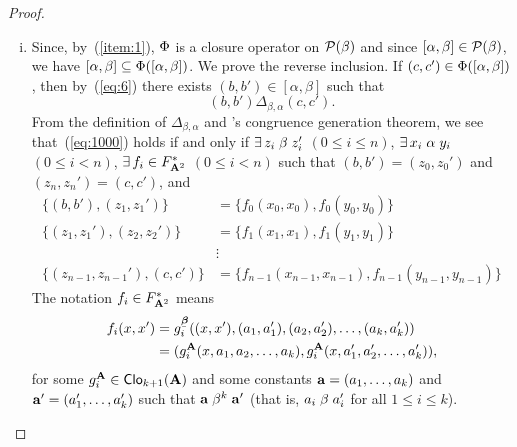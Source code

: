 \documentclass[11pt]{amsart}
\numberwithin{equation}{section}
\theoremstyle{plain}
\theoremstyle{definition}
\begin{document}
\begin{proof}
\begin{enumerate}[(i)]
  \item
    Since, by~(\ref{item:1}), $\Phi$ is a closure operator on $\mathcal{P}(\beta)$
    and since $[\alpha, \beta] \in \mathcal{P}(\beta)$, 
    we have $[\alpha, \beta] \subseteq \Phi([\alpha, \beta])$.
    We prove the reverse inclusion.
    If $(c,c')\in \Phi([\alpha, \beta])$, then %
    by~(\ref{eq:6}) there exists $(b,b')\in [\alpha, \beta]$ such that
    \begin{equation}
      \label{eq:1000}
      (b,b') \mathrel{\Delta_{\beta, \alpha}} (c,c').
    \end{equation}
    From the definition of $\Delta_{\beta, \alpha}$ and 
    \malcev's congruence generation theorem, we see that~(\ref{eq:1000})
    holds if and only if
    $\exists \, z_i \mathrel{\beta} z_i'$ $(0\leq i \leq n)$,
    $\exists \, x_i \mathrel{\alpha} y_i$ $(0\leq i < n)$,
    $\exists\, f_i \in F_{\mathbf{A}^2}^\ast$ $(0\leq i < n)$
    such that
    $(b, b') = (z_0,z_0')$ and
    $(z_n,z_n') = (c, c')$, and
    \begin{align}
      \label{eq:0}
      \{(b, b'),(z_1,z_1')\} &= \{f_0(x_0,x_0), f_0(y_0,y_0)\}\\
      \label{eq:1}
      \{(z_1,z_1'),(z_2,z_2')\} &= \{f_1(x_1,x_1), f_1(y_1,y_1)\}\\
      \nonumber
      & \vdots\\
      \nonumber
      \{(z_{n-1},z_{n-1}'),(c, c')\} &= \{f_{n-1}(x_{n-1},x_{n-1}), f_{n-1}(y_{n-1},y_{n-1})\}
    \end{align}
    The notation $f_i\in F^*_{\mathbf{A}^2}$ means 
    \begin{align*}
      f_i(x, x') &= g_i^{\bbeta}((x, x'), (a_1, a_1'), (a_2, a_2'), \dots, (a_k, a_k') )\\
      &= (g_i^{\bA}(x, a_1, a_2, \dots, a_k), g_i^{\bA}(x, a_1', a_2', \dots, a_k')),
    \end{align*}
    for some $g_i^{\mathbf{A}} \in \operatorname{\mathsf{Clo}}_{k+1}(\mathbf{A})$ and some constants 
    $\mathbf{a} = (a_1, \dots, a_k)$ and $\mathbf{a}' = (a_1', \dots, a_k')$ such that
    $\mathbf{a}\mathrel{\beta^k} \mathbf{a}'$ (that is, $a_i \mathrel{\beta} a_i'$ for all $1\leq i\leq k$). 

\end{enumerate}
\end{proof}
\end{document}
